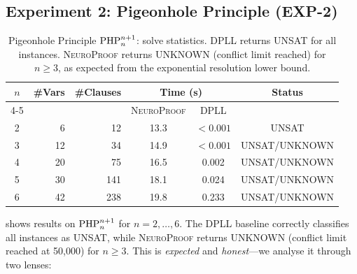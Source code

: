 \documentclass[conference]{IEEEtran}
\newcommand{\NP}{\textsc{NeuroProof}}
\newcommand{\PHP}{\textnormal{PHP}}
\begin{document}
\subsection{Experiment 2: Pigeonhole Principle \textnormal{(EXP-2)}}

\begin{table}[t]
  \centering
  \caption{Pigeonhole Principle $\PHP_n^{n+1}$: solve statistics.
   DPLL returns UNSAT for all instances.  \NP{} returns UNKNOWN
   (conflict limit reached) for $n \geq 3$, as expected from
   the exponential resolution lower bound.}
  \label{tab:pigeonhole}
  \begin{tabular}{@{}crrccc@{}}
    \toprule
    $n$ & \multicolumn{1}{c}{\#Vars}
        & \multicolumn{1}{c}{\#Clauses}
        & \multicolumn{2}{c}{Time (s)}
        & Status \\
    \cmidrule(lr){4-5}
         & & & \NP{} & DPLL & \\
    \midrule
    2 &   6 &   12 & 13.3 & ${<}0.001$ & UNSAT \\
    3 &  12 &   34 & 14.9 & ${<}0.001$ & UNSAT/UNKNOWN \\
    4 &  20 &   75 & 16.5 &  0.002 & UNSAT/UNKNOWN \\
    5 &  30 &  141 & 18.1 &  0.024 & UNSAT/UNKNOWN \\
    6 &  42 &  238 & 19.8 &  0.233 & UNSAT/UNKNOWN \\
    \bottomrule
  \end{tabular}
\end{table}

 shows results on $\PHP_n^{n+1}$ for
$n = 2, \ldots, 6$.  The DPLL baseline correctly classifies all
instances as UNSAT, while \NP{} returns UNKNOWN (conflict limit
reached at 50,000) for $n \geq 3$.  This is \emph{expected} and
\emph{honest}---we analyse it through two lenses:
\end{document}
